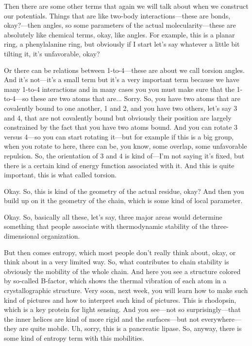 Then there are some other terms that again we will talk about when we construct our potentials. Things that are like two-body interactions—these are bonds, okay?—then angles, so some parameters of the actual molecularity—these are absolutely like chemical terms, okay, like angles. For example, this is a planar ring, a phenylalanine ring, but obviously if I start let's say whatever a little bit tilting it, it's unfavorable, okay?

Or there can be relations between 1-to-4—these are about we call torsion angles. And it's not—it's a small term but it's a very important term because we have many 1-to-4 interactions and in many cases you you must make sure that the 1-to-4—so these are two atoms that are... Sorry. So, you have two atoms that are covalently bound to one another, 1 and 2, and you have two others, let’s say 3 and 4, that are not covalently bound but obviously their position are largely constrained by the fact that you have two atoms bound. And you can rotate 3 versus 4—so you can start rotating it—but for example if this is a big group, when you rotate to here, there can be, you know, some overlap, some unfavorable repulsion. So, the orientation of 3 and 4 is kind of—I’m not saying it's fixed, but there is a certain kind of energy function associated with it. And this is quite important, this is what called torsion.

Okay. So, this is kind of the geometry of the actual residue, okay? And then you build up on it the geometry of the chain, which is some kind of local parameter.

Okay. So, basically all these, let’s say, three major areas would determine something that people associate with thermodynamic stability of the three-dimensional organization.


But then comes entropy, which most people don't really think about, okay, or think about in a very limited way. So, what contributes to chain stability is obviously the mobility of the whole chain. And here you see a structure colored by so-called B-factor, which shows the thermal vibration of each atom in a crystallographic structure. Very soon, next week, you will learn how to make such kind of pictures and how to interpret such kind of pictures. This is rhodopsin, which is a key protein for light sensing. And you see—not so surprisingly—that the inner helices are kind of more rigid and the surfaces—but not everywhere—they are quite mobile. Uh, sorry, this is a pancreatic lipase. So, anyway, there is some kind of entropy term with this mobilities.



